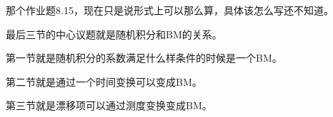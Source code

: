 那个作业题8.15，现在只是说形式上可以那么算，具体该怎么写还不知道。

最后三节的中心议题就是随机积分和BM的关系。

第一节就是随机积分的系数满足什么样条件的时候是一个BM。

第二节就是通过一个时间变换可以变成BM。

第三节就是漂移项可以通过测度变换变成BM。

\begin{comment}

\section{边界值问题}

D是$\mathbb{R}^n$中连通开集，
\[
  L=\sum_{i=1}^{n} b_{i}(x) \frac{\partial}{\partial x_{i}}+\sum_{i, j=1}^{n} a_{i j}(x) \frac{\partial^{2}}{\partial x_{i} \partial x_{j}}
\]

是$C^2(\mathbb{R}^n)$中的（半）椭圆算子，即$a_{ij}$（半）正定。

\subsection{组合Dirichlet-Poisson问题解的唯一性}

设$\phi \in C(\partial D), g \in C(D)$是给定的函数，求$w \in C^{2}(D)$使得

1. $L w=-g$, in D.

2. $\lim_{x \rightarrow y, x \in D} w(x)=\phi(y), \quad y \in \partial D$.

求解思想：一开始的思路跟之前Feymann-Kac公式的思路差不多，由PDE得到生成元算子，构造对应SDE，然后找到随机过程$X_t$，用这个过程可以写出上述问题的概率解。（$X_{t}$的生成元算子A与L在$C_{0}^{2}\left(\mathbb{R}^{n}\right)$上相同，简言之$\frac{1}{2} \sigma(x) \sigma^{T}(x)=\left[a_{i j}(x)\right]$）

\begin{thm}（唯一性定理1）
  设$\phi$有界，g满足$E^{x}\left[\int_{0}^{\tau_{D}}|g\left(X_{t}\right)| d t\right]<\infty$（控制收敛定理）。$w \in C^{2}(D)$是有界解且满足
  
  1. $L w=-g$, in D.
  
  2'. $\lim_{t \rightarrow \tau_{D}} w\left(X_{t}\right)=\phi\left(X_{\tau_{D}}\right) 1_{\tau_{D}<\infty}, \quad y \in \partial D$. 
  
  则
  \[
    w(x)=E^{x}\left[\phi\left(X_{\tau_{D}}\right) \cdot 1_{\tau_{D}<\infty}\right]+E^{x}\left[\int_{0}^{\tau_{D}} g\left(X_{t}\right) d t\right] .
  \]
\end{thm}


\end{comment}
